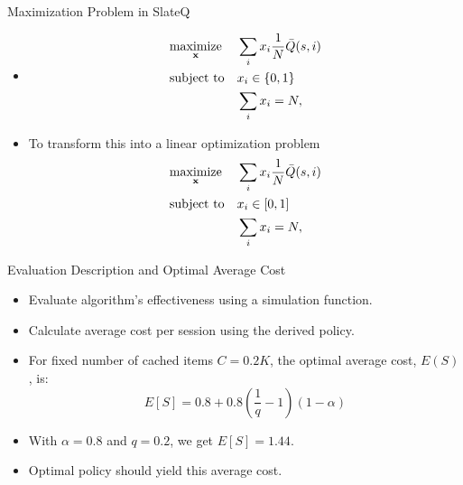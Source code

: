 \documentclass{beamer}
\begin{document}
    \begin{frame}{Maximization Problem in SlateQ}
        \begin{itemize}
            \item \begin{equation*}
                \begin{aligned}
                & \underset{\bf x}{\text{maximize}}
                & & \sum_i x_i\frac{1}{N}\bar{Q}(s,i) \\
                & \text{subject to}
                & &x_i \in \{0,1\} \\
                & & & \sum_{i} x_i = N,
                \end{aligned}
            \end{equation*}
            \item To transform this into a linear optimization problem
            \begin{equation*}
                \begin{aligned}
                & \underset{\bf x}{\text{maximize}}
                & & \sum_i x_i\frac{1}{N}\bar{Q}(s,i) \\
                & \text{subject to}
                & &x_i \in [0,1] \\
                & & & \sum_{i} x_i = N,
                \end{aligned}
            \end{equation*}
        \end{itemize}
    \end{frame}
    \begin{frame}{Evaluation Description and Optimal Average Cost}
        \begin{itemize}
            \item Evaluate algorithm's effectiveness using a simulation function.
            \item Calculate average cost per session using the derived policy.
            \item For fixed number of cached items $C=0.2K$, the optimal average cost, $E(S)$, is:
            \begin{equation*}
                E[S] = 0.8 + 0.8(\frac{1}{q}-1)(1-\alpha)
            \end{equation*}
            \item With $\alpha = 0.8$ and $q=0.2$, we get $E[S] = 1.44$.
            \item Optimal policy should yield this average cost.
        \end{itemize}
        \end{frame}
        
\end{document}
